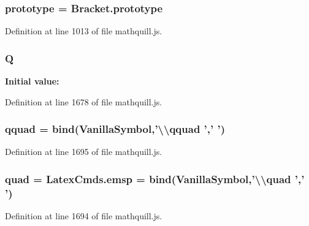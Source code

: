 \subsubsection[{prototype}]{ prototype = Bracket.\-prototype}\label{mathquill_8js_acdd925bff392dc63016a16a80bb64c1a}


Definition at line 1013 of file mathquill.\-js.

\subsubsection[{Q}]{ Q}\label{mathquill_8js_a95717f8c4865ff034208e013987b8148}
{\bfseries Initial value\-:}


Definition at line 1678 of file mathquill.\-js.

\subsubsection[{qquad}]{ qquad = {\bf bind}({\bf Vanilla\-Symbol},'\textbackslash{}\textbackslash{}qquad ',' ')}\label{mathquill_8js_a54f02ad6ac0994ac333c359cfe613ed2}


Definition at line 1695 of file mathquill.\-js.

\subsubsection[{quad}]{ quad = Latex\-Cmds.\-emsp = {\bf bind}({\bf Vanilla\-Symbol},'\textbackslash{}\textbackslash{}quad ',' ')}\label{mathquill_8js_abe263af74ee37c98ce4dd63e28bb76d2}


Definition at line 1694 of file mathquill.\-js.

